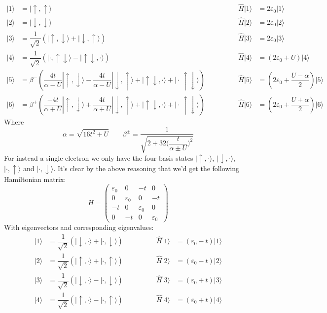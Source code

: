 \documentclass[12pt]{article}
\begin{document}
\begin{align*}
|1\rangle&=|\!\uparrow,\uparrow\rangle\qquad\qquad&\hat{H}|1\rangle&=2\varepsilon_0|1\rangle\\
|2\rangle&=|\!\downarrow,\downarrow\rangle\qquad\qquad&\hat{H}|2\rangle&=2\varepsilon_0|2\rangle\\
|3\rangle&=\dfrac{1}{\sqrt{2}}(|\!\uparrow,\downarrow\rangle+|\!\downarrow,\uparrow\rangle)\qquad\qquad&\hat{H}|3\rangle&=2\varepsilon_0|3\rangle\\
|4\rangle&=\dfrac{1}{\sqrt{2}}(|\cdot,\uparrow\downarrow\rangle-|\uparrow\downarrow,\cdot\rangle)\qquad\qquad&\hat{H}|4\rangle&=(2\varepsilon_0+U)|4\rangle\\
|5\rangle&=\beta^-(\dfrac{4t}{\alpha-U}|\uparrow,\downarrow\rangle-\dfrac{4t}{\alpha-U}|\downarrow,\uparrow\rangle+|\uparrow\downarrow,\cdot\rangle+|\cdot\,\uparrow\downarrow\rangle)\qquad\qquad&\hat{H}|5\rangle&=(2\varepsilon_0+\dfrac{U-\alpha}{2})|5\rangle\\
|6\rangle&=\beta^+(\dfrac{-4t}{\alpha+U}|\uparrow,\downarrow\rangle+\dfrac{4t}{\alpha+U}|\downarrow,\uparrow\rangle+|\uparrow\downarrow,\cdot\rangle+|\cdot\,\uparrow\downarrow\rangle)\qquad\qquad&\hat{H}|6\rangle&=(2\varepsilon_0+\dfrac{U+\alpha}{2})|6\rangle
\end{align*}
Where
$$\alpha=\sqrt{16t^2+U}\qquad\beta^\pm=\dfrac{1}{\sqrt{2+32\bigg (\dfrac{t}{\alpha\pm U}\bigg )^2}}$$
For instead a single electron we only have the four basis states $|\uparrow,\cdot\rangle$, $|\downarrow,\cdot\rangle$, $|\cdot,\uparrow\rangle$ and $|\cdot,\downarrow\rangle$. It's clear by the above reasoning that we'd get the following Hamiltonian matrix:
\begin{equation}
H=\begin{pmatrix}
\varepsilon_0&0&-t&0\\
0&\varepsilon_0&0&-t\\
-t&0&\varepsilon_0&0\\
0&-t&0&\varepsilon_0
\end{pmatrix}
\end{equation}
With eigenvectors and corresponding eigenvalues:
\begin{align*}
|1\rangle&=\dfrac{1}{\sqrt{2}}(|\downarrow,\cdot\rangle+|\cdot,\downarrow\rangle)\qquad\qquad&\hat{H}|1\rangle&=(\varepsilon_0-t)|1\rangle\\
|2\rangle&=\dfrac{1}{\sqrt{2}}(|\uparrow,\cdot\rangle+|\cdot,\uparrow\rangle)\qquad\qquad&\hat{H}|2\rangle&=(\varepsilon_0-t)|2\rangle\\
|3\rangle&=\dfrac{1}{\sqrt{2}}(|\downarrow,\cdot\rangle-|\cdot,\downarrow\rangle)\qquad\qquad&\hat{H}|3\rangle&=(\varepsilon_0+t)|3\rangle\\
|4\rangle&=\dfrac{1}{\sqrt{2}}(|\uparrow,\cdot\rangle-|\cdot,\uparrow\rangle)\qquad\qquad&\hat{H}|4\rangle&=(\varepsilon_0+t)|4\rangle\\
\end{align*}
\end{document}
